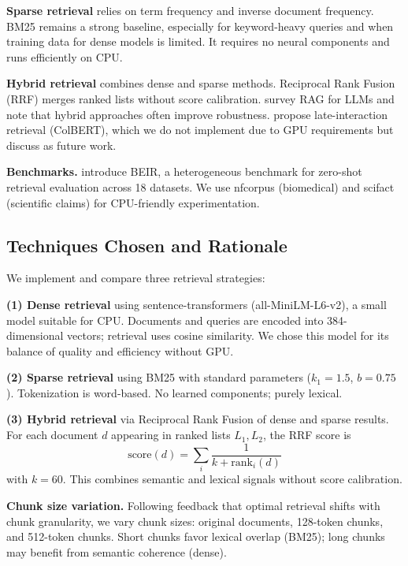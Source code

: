 \documentclass[twoside,11pt]{article}
\begin{document}
\textbf{Sparse retrieval} relies on term frequency and inverse document frequency. BM25 \citep{robertson2009probabilistic} remains a strong baseline, especially for keyword-heavy queries and when training data for dense models is limited. It requires no neural components and runs efficiently on CPU.

\textbf{Hybrid retrieval} combines dense and sparse methods. Reciprocal Rank Fusion (RRF) merges ranked lists without score calibration. \citet{gao2022rag} survey RAG for LLMs and note that hybrid approaches often improve robustness. \citet{khattab2020colbert} propose late-interaction retrieval (ColBERT), which we do not implement due to GPU requirements but discuss as future work.

\textbf{Benchmarks.} \citet{thakur2021beir} introduce BEIR, a heterogeneous benchmark for zero-shot retrieval evaluation across 18 datasets. We use nfcorpus (biomedical) and scifact (scientific claims) for CPU-friendly experimentation.

\subsection{Techniques Chosen and Rationale}

We implement and compare three retrieval strategies:

\textbf{(1) Dense retrieval} using sentence-transformers (all-MiniLM-L6-v2), a small model suitable for CPU. Documents and queries are encoded into 384-dimensional vectors; retrieval uses cosine similarity. We chose this model for its balance of quality and efficiency without GPU.

\textbf{(2) Sparse retrieval} using BM25 with standard parameters ($k_1 = 1.5$, $b = 0.75$). Tokenization is word-based. No learned components; purely lexical.

\textbf{(3) Hybrid retrieval} via Reciprocal Rank Fusion of dense and sparse results. For each document $d$ appearing in ranked lists $L_1, L_2$, the RRF score is
$$
\text{score}(d) = \sum_{i} \frac{1}{k + \text{rank}_i(d)}
$$
with $k = 60$. This combines semantic and lexical signals without score calibration.

\textbf{Chunk size variation.} Following feedback that optimal retrieval shifts with chunk granularity, we vary chunk sizes: original documents, 128-token chunks, and 512-token chunks. Short chunks favor lexical overlap (BM25); long chunks may benefit from semantic coherence (dense).

\end{document}
